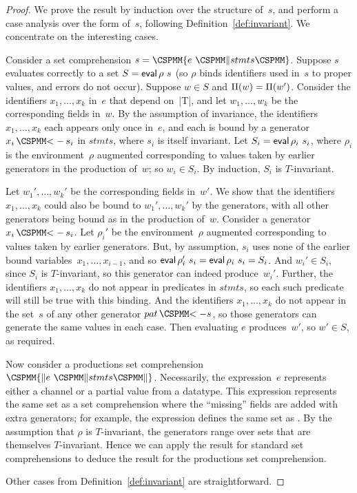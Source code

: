 \begin{proof}
We prove the result by induction over the structure of~$s$, and perform a case
analysis over the form of~$s$, following Definition~\ref{def:invariant}.  We
concentrate on the interesting cases.

Consider a set comprehension $s = \M\{ e ~ \M\| stmts \M\}$.  Suppose $s$
evaluates correctly to a set $S = \mathop{\sf eval} \rho~s$ (so $\rho$ binds identifiers
used in~$s$ to proper values, and errors do not occur).  Suppose $w \in S$ and
$\Pi(w) = \Pi(w')$.  Consider the identifiers $x_1,\ldots,x_k$ in~$e$
that depend on~|T|, and let $w_1,\ldots,w_k$ be the corresponding fields
in~$w$.  By the assumption of invariance, the identifiers $x_1,\ldots,x_k$
each appears only once in~$e$, and each is bound by a generator 
%
$x_i \,\M{<-}\, s_i$ in $stmts$, where $s_i$ is itself invariant.  Let $S_i =
\mathop{\sf eval} \rho_i~s_i$, where $\rho_i$ is the environment~$\rho$ augmented
corresponding to values taken by earlier generators in the production of~$w$;
so $w_i \in S_i$.  
By induction, $S_i$ is $T$-invariant.

Let $w_1',\ldots,w_k'$ be the corresponding fields in~$w'$.  We show that the
identifiers $x_1,\ldots,x_k$ could also be bound to $w_1',\ldots,w_k'$ by the
generators, with all other generators being bound as in the production of~$w$.
Consider a generator $x_i \,\M{<-}\, s_i$.  Let $\rho_i'$ be the
environment~$\rho$ augmented corresponding to values taken by earlier
generators.  But, by assumption, $s_i$ uses none of the earlier bound
variables~$x_1,\ldots,x_{i-1}$, and so 
%
$\mathop{\sf eval} \rho_i'~s_i = \mathop{\sf eval} \rho_i~s_i = S_i$.  And $w_i' \in S_i$, since $S_i$
is $T$-invariant, so this generator can indeed produce~$w_i'$.  Further, the
identifiers $x_1,\ldots,x_k$ do not appear in predicates in $stmts$, so each
such predicate will still be true with this binding.  And the identifiers
$x_1,\ldots,x_k$ do not appear in the set~$s$ of any other generator $pat
\,\M{<-} s$, so those generators can generate the same values in each case.
Then evaluating $e$ produces~$w'$, so $w' \in S$, as required.

Now consider a productions set comprehension $\M{\{\|} e ~ \M\| stmts
\M{\|\}}$.  Necessarily, the expression~$e$ represents either a channel or a
partial value from a datatype.  This expression represents the same set as a
set comprehension where the ``missing'' fields are added with extra
generators; for example, the expression  defines the same
set as .  By the assumption that
$\rho$ is  $T$-invariant, the generators range over sets that are
themselves $T$-invariant.  Hence we can apply the result for standard set
comprehensions to deduce the result for the productions set comprehension.

Other cases from Definition~\ref{def:invariant} are straightforward.
\end{proof}

